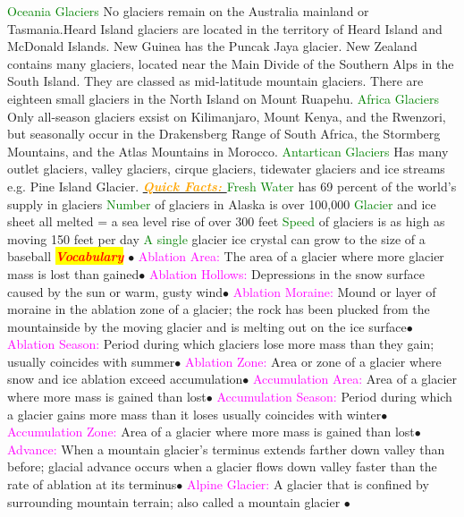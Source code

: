 \documentclass{article}
\newcommand{\ddd}{$\bullet$}
\newcommand{\red}[1]{\textcolor{red}{#1}}
\newcommand{\green}[1]{\textcolor{green}{#1}}
\newcommand{\pink}[1]{\textcolor{magenta}{#1}}
\newcommand{\orange}[1]{\textcolor{orange}{#1}}
\newcommand{\mysection}[1]{\colorbox{yellow}{\textbf{\textit{\red{#1}}}}}
\newcommand{\mysub}[1]{\underline{\textbf{{\textit{\orange{#1}}}}}}
\newcommand{\mysubsub}[1]{{{\green{#1}}}}
\newcommand{\vocab}[1]{{\pink{#1}}}
\begin{document}
\begin{multicols*}{4}
		    \mysubsub{Oceania Glaciers} No glaciers remain on the Australia mainland or Tasmania.Heard Island glaciers are located in the territory of Heard Island and McDonald Islands. New Guinea has the Puncak Jaya glacier. New Zealand contains many glaciers,  located near the Main Divide of the Southern Alps in the South Island. They are classed as mid-latitude mountain glaciers. There are eighteen small glaciers in the North Island on Mount Ruapehu.
		    \mysubsub{Africa Glaciers} Only all-season glaciers exsist on Kilimanjaro, Mount Kenya, and the Rwenzori, but seasonally occur in the Drakensberg Range of South Africa, the Stormberg Mountains, and the Atlas Mountains in Morocco.
		    \mysubsub{Antartican Glaciers} Has many outlet glaciers, valley glaciers, cirque glaciers, tidewater glaciers and ice streams e.g. Pine Island Glacier. 
		    \mysub{Quick Facts: }
		    \mysubsub{Fresh Water} has 69 percent of the world's supply in glaciers
		    \mysubsub{Number} of glaciers in Alaska is over 100,000
		    \mysubsub{Glacier} and ice sheet all melted = a sea level rise of over 300 feet
		    \mysubsub{Speed} of glaciers is as high as moving 150 feet per day
		    \mysubsub{A single} glacier ice crystal can grow to the size of a baseball
	\mysection{Vocabulary} 
		\ddd
		\vocab{        Ablation Area: } The area of a glacier where more glacier mass is lost than gained\ddd
		\vocab{        Ablation Hollows: } Depressions in the snow surface caused by the sun or warm, gusty wind\ddd
		\vocab{        Ablation Moraine: } Mound or layer of moraine in the ablation zone of a glacier; the rock has been plucked from the mountainside by the moving glacier and is melting out on the ice surface\ddd
		\vocab{        Ablation Season: } Period during which glaciers lose more mass than they gain; usually coincides with summer\ddd
		\vocab{        Ablation Zone: } Area or zone of a glacier where snow and ice ablation exceed accumulation\ddd
		\vocab{        Accumulation Area: } Area of a glacier where more mass is gained than lost\ddd
		\vocab{        Accumulation Season: } Period during which a glacier gains more mass than it loses usually coincides with winter\ddd
		\vocab{        Accumulation Zone: } Area of a glacier where more mass is gained than lost\ddd
		\vocab{        Advance: } When a mountain glacier’s terminus extends farther down valley than before; glacial advance occurs when a glacier flows down valley faster than the rate of ablation at its terminus\ddd
		\vocab{        Alpine Glacier: } A glacier that is confined by surrounding mountain terrain; also called a mountain glacier \ddd

\end{multicols*}
\end{document}
